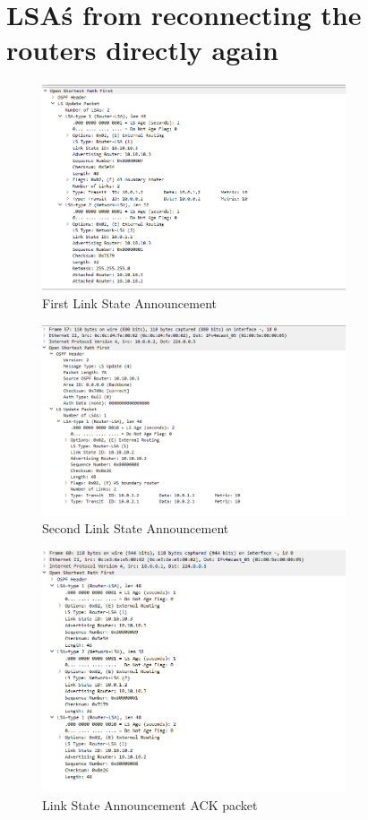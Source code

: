 \documentclass{article}
\begin{document}
	\section{LSA\'s from reconnecting the routers directly again}
		\begin{figure}[h!]
			\centering
			\includegraphics[width=0.8\textwidth]{first_lsa}
			\caption{First Link State Announcement}
		\end{figure}
		\begin{figure}[h!]
			\centering
			\includegraphics[width=0.8\textwidth]{second_lsa}
			\caption{Second Link State Announcement}
		\end{figure}
		\newpage
		\begin{figure}[h!]
			\centering
			\includegraphics[width=0.8\textwidth]{lsa_ack}
			\caption{Link State Announcement ACK packet}
		\end{figure}
\end{document}
